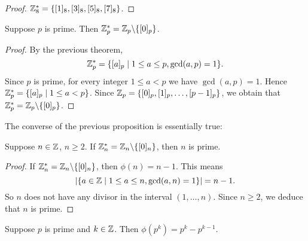 \begin{proof}
    $\mathbb{Z}_8^*=\{[1]_8,[3]_8,[5]_8,[7]_8\}$.
\end{proof}

\begin{proposition}
    Suppose $p$ is prime. Then $\mathbb{Z}_p^*=\mathbb{Z}_p\backslash\{[0]_p\}$.
\end{proposition}

\begin{proof}
    By the previous theorem,
    \[\mathbb{Z}_p^*=\{[a]_p\mid 1\leq a\leq p,\gcd(a,p)=1\}.\]
    Since $p$ is prime, for every integer $1\leq a<p$ we have
    $\gcd(a,p)=1$. Hence $\mathbb{Z}_p^*=\{[a]_p\mid 1\leq a<p\}$.
    Since $\mathbb{Z}_p=\{[0]_p,[1]_p,\dots,[p-1]_p\}$,
    we obtain that $\mathbb{Z}_p^*=\mathbb{Z}_p\backslash\{[0]_p\}$.
\end{proof}

The converse of the previous proposition is essentially true:

\begin{proposition}
    Suppose $n\in\mathbb{Z}$, $n\geq 2$. If $\mathbb{Z}_n^*=\mathbb{Z}_n\backslash\{[0]_n\}$,
    then $n$ is prime.
\end{proposition}

\begin{proof}
    If $\mathbb{Z}_n^*=\mathbb{Z}_n\backslash\{[0]_n\}$, then $\phi(n)=n-1$.
    This means
    \[|\{a\in\mathbb{Z}\mid 1\leq a\leq n,\gcd(a,n)=1\}|=n-1.\]
    So $n$ does not have any divisor in the interval $(1,\dots,n)$.
    Since $n\geq 2$, we deduce that $n$ is prime.
\end{proof}

\begin{example}
    Suppose $p$ is prime and $k\in\mathbb{Z}$. Then $\phi(p^k)=p^k-p^{k-1}$.
\end{example}

